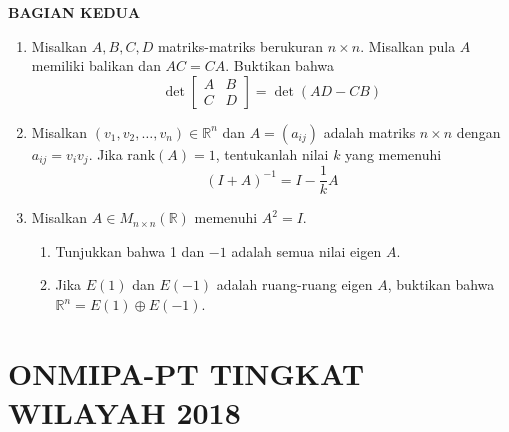 \documentclass[12pt,twoside]{article}
\begin{document}
\newpage \textbf{BAGIAN KEDUA}
\begin{enumerate}
	\item Misalkan $A,B,C,D $ matriks-matriks berukuran $n \times n$. Misalkan pula $A$ memiliki balikan dan $AC=CA$. Buktikan bahwa
	      \begin{equation*}
		      \det \left[ \begin{array}{cc}
				      A & B \\C&D
			      \end{array} \right] = \det (AD-CB)
	      \end{equation*}

	\item Misalkan $(v_1,v_2,\dots,v_n) \in \mathbb{R}^n$ dan $A = (a_{ij})$ adalah matriks $n \times n$ dengan $a_{ij}=v_{i}v_j$. Jika rank$(A)=1$, tentukanlah nilai $k$ yang memenuhi
	      \begin{equation*}
		      (I+A)^{-1} = I - \dfrac{1}{k}A
	      \end{equation*}

	\item Misalkan $A \in M_{n \times n}(\mathbb{R})$ memenuhi $A^2=I$.
	      \begin{enumerate}
		      \item Tunjukkan bahwa 1 dan $-1$ adalah semua nilai eigen $A$.

		      \item Jika $E(1)$ dan $E(-1)$ adalah ruang-ruang eigen $A$, buktikan bahwa $\mathbb{R}^n = E(1) \oplus E(-1).$
	      \end{enumerate}
\end{enumerate}
\newpage
{}
\section{ONMIPA-PT TINGKAT WILAYAH 2018}
\end{document}
